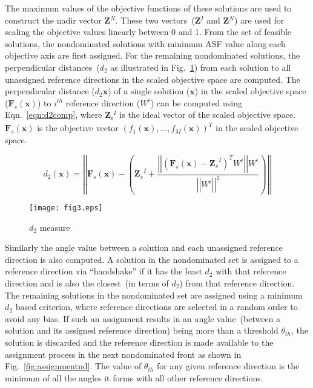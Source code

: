 The maximum values of the objective functions of these solutions are used to construct the nadir vector \textbf{Z}$^N$. These two vectors~(\textbf{Z}$^I$ and \textbf{Z}$^N$) are used for scaling the objective values linearly between 0 and 1. From the set of feasible solutions, the nondominated solutions with minimum ASF value along each objective axis are first assigned. For the remaining nondominated solutions, the perpendicular distances~($d_2$ as illustrated in Fig.~\ref{fig:distance_d1d2}) from each solution to all unassigned reference directions in the scaled objective space are computed. The perpendicular distance ($d_2\textbf{x}$) of a single solution ($\textbf{x}$) in the scaled objective space ($\textbf{F}_s(\textbf{x})$) to $i^{th}$ reference direction ($W^i$) can be computed using Eqn.~\ref{eqn:d2comp}, where \textbf{Z}\textsubscript{s}$^I$ is the ideal vector of the scaled objective space. $\textbf{F}_s(\textbf{x})$ is the objective vector $(f_1(\textbf{x}),\ldots, f_M(\textbf{x}))^T$ in the scaled objective space. 

\begin{equation}
d_2(\textbf{x}) = \left\vert\left\vert\textbf{F}_s(\textbf{x}) - \left({\textbf{Z}_s}^I + \frac{\left\vert\left\vert\left(\textbf{F}_s(\textbf{x}) - {\textbf{Z}_s}^I\right)^T W^i\right\vert\right\vert W^i}{{\left\vert\left\vert W^i \right\vert\right\vert}^2}\right)\right\vert\right\vert
\label{eqn:d2comp} 
\end{equation} 

\begin{figure}[!htb]
	\centering
	\texttt{[image: fig3.eps]}
	\caption{$d_2$ measure}
	\label{fig:distance_d1d2}
\end{figure}

Similarly the angle value between a solution and each unassigned reference direction is also computed. A solution in the nondominated set is assigned to a reference direction via ``handshake'' if it has the least $d_2$ with that reference direction and is also the closest~(in terms of $d_2$) from that reference direction. The remaining solutions in the nondominated set are assigned using  a minimum $d_2$ based criterion, where reference directions are selected in a random order to avoid any bias. If such an assignment results in an angle value~(between a solution and its assigned reference direction) being more than a threshold $\theta_{th}$, the solution is discarded and the reference direction is made available to the assignment process in the next nondominated front as shown in Fig.~\ref{fig:assignmentnd}. The value of $\theta_{th}$ for any given reference direction is the minimum of all the angles it forms with all other reference directions.

